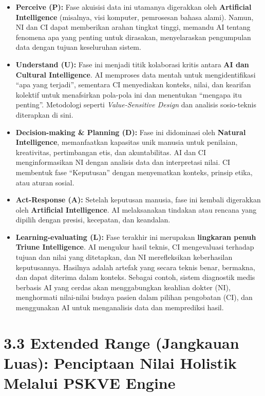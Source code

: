 \documentclass[
  letterpaper,
  DIV=11,
  numbers=noendperiod]{scrreprt}
\providecommand{\tightlist}{%
  \setlength{\itemsep}{0pt}\setlength{\parskip}{0pt}}
\begin{document}
\begin{itemize}
\tightlist
\item
  \textbf{Perceive (P):} Fase akuisisi data ini utamanya digerakkan oleh
  \textbf{Artificial Intelligence} (misalnya, visi komputer, pemrosesan
  bahasa alami). Namun, NI dan CI dapat memberikan arahan tingkat
  tinggi, memandu AI tentang fenomena apa yang penting untuk dirasakan,
  menyelaraskan pengumpulan data dengan tujuan keseluruhan sistem.
\item
  \textbf{Understand (U):} Fase ini menjadi titik kolaborasi kritis
  antara \textbf{AI dan Cultural Intelligence}. AI memproses data mentah
  untuk mengidentifikasi ``apa yang terjadi'', sementara CI menyediakan
  konteks, nilai, dan kearifan kolektif untuk menafsirkan pola-pola ini
  dan menentukan ``mengapa itu penting''. Metodologi seperti
  \emph{Value-Sensitive Design} dan analisis sosio-teknis diterapkan di
  sini.
\item
  \textbf{Decision-making \& Planning (D):} Fase ini didominasi oleh
  \textbf{Natural Intelligence}, memanfaatkan kapasitas unik manusia
  untuk penilaian, kreativitas, pertimbangan etis, dan akuntabilitas. AI
  dan CI menginformasikan NI dengan analisis data dan interpretasi
  nilai. CI membentuk fase ``Keputusan'' dengan menyematkan konteks,
  prinsip etika, atau aturan sosial.
\item
  \textbf{Act-Response (A):} Setelah keputusan manusia, fase ini kembali
  digerakkan oleh \textbf{Artificial Intelligence}. AI melaksanakan
  tindakan atau rencana yang dipilih dengan presisi, kecepatan, dan
  keandalan.
\item
  \textbf{Learning-evaluating (L):} Fase terakhir ini merupakan
  \textbf{lingkaran penuh Triune Intelligence}. AI mengukur hasil
  teknis, CI mengevaluasi terhadap tujuan dan nilai yang ditetapkan, dan
  NI merefleksikan keberhasilan keputusannya. Hasilnya adalah artefak
  yang secara teknis benar, bermakna, dan dapat diterima dalam konteks.
  Sebagai contoh, sistem diagnostik medis berbasis AI yang cerdas akan
  menggabungkan keahlian dokter (NI), menghormati nilai-nilai budaya
  pasien dalam pilihan pengobatan (CI), dan menggunakan AI untuk
  menganalisis data dan memprediksi hasil.
\end{itemize}

\section{\texorpdfstring{\textbf{3.3 Extended Range (Jangkauan Luas):
Penciptaan Nilai Holistik Melalui PSKVE
Engine}}{3.3 Extended Range (Jangkauan Luas): Penciptaan Nilai Holistik Melalui PSKVE Engine}}\label{extended-range-jangkauan-luas-penciptaan-nilai-holistik-melalui-pskve-engine}
\end{document}

